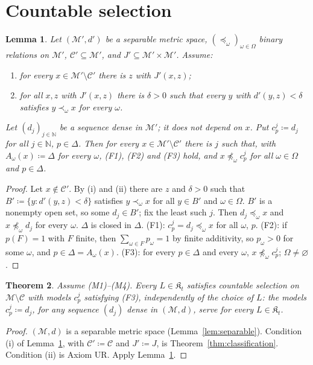 \documentclass[11pt]{article}
\newtheorem{theorem}{Theorem}[section]
\newtheorem{lemma}[theorem]{Lemma}
\theoremstyle{definition}
\newcommand{\M}{\mathcal M}
\newcommand{\C}{\mathcal C}
\newcommand{\K}{\mathfrak K}
\newcommand{\N}{\mathbb N}
\begin{document}
\section{Countable selection}\label{sec:selection}

\begin{lemma}\label{lem:general-selection}
Let $(\M',d')$ be a separable metric space, $(\preceq_\omega)_{\omega\in\Omega}$ binary relations on $\M'$, $\C'\subseteq\M'$, and $J'\subseteq\M'\times\M'$. Assume:
\begin{enumerate}[label=(\roman*)]
\item for every $x\in\M'\setminus\C'$ there is $z$ with $J'(x,z)$;
\item for all $x,z$ with $J'(x,z)$ there is $\delta>0$ such that every $y$ with $d'(y,z)<\delta$ satisfies $y\prec_\omega x$ for every $\omega$.
\end{enumerate}
Let $(d_j)_{j\in\N}$ be a sequence dense in $\M'$; it does not depend on $x$. Put $c^j_p\coloneqq d_j$ for all $j\in\N$, $p\in\Delta$. Then for every $x\in\M'\setminus\C'$ there is $j$ such that, with $A_\omega(x)\coloneqq\Delta$ for every $\omega$, (F1), (F2) and (F3) hold, and $x\not\preceq_\omega c^j_p$ for all $\omega\in\Omega$ and $p\in\Delta$.
\end{lemma}
\begin{proof}
Let $x\notin\C'$. By (i) and (ii) there are $z$ and $\delta>0$ such that $B'\coloneqq\{y:d'(y,z)<\delta\}$ satisfies $y\prec_\omega x$ for all $y\in B'$ and $\omega\in\Omega$. $B'$ is a nonempty open set, so some $d_j\in B'$; fix the least such $j$. Then $d_j\preceq_\omega x$ and $x\not\preceq_\omega d_j$ for every $\omega$. $\Delta$ is closed in $\Delta$. (F1): $c^j_p=d_j\preceq_\omega x$ for all $\omega$, $p$. (F2): if $p(F)=1$ with $F$ finite, then $\sum_{\omega\in F}p_\omega=1$ by finite additivity, so $p_\omega>0$ for some $\omega$, and $p\in\Delta=A_\omega(x)$. (F3): for every $p\in\Delta$ and every $\omega$, $x\not\preceq_\omega c^j_p$; $\Omega\ne\varnothing$.
\end{proof}

\begin{theorem}\label{thm:selection}
Assume (M1)--(M4). Every $L\in\K_t$ satisfies countable selection on $\M\setminus\C$ with models $c^j_p$ satisfying (F3), independently of the choice of $L$: the models $c^j_p\coloneqq d_j$, for any sequence $(d_j)$ dense in $(\M,d)$, serve for every $L\in\K_t$.
\end{theorem}
\begin{proof}
$(\M,d)$ is a separable metric space (Lemma~\ref{lem:separable}). Condition (i) of Lemma~\ref{lem:general-selection}, with $\C'\coloneqq\C$ and $J'\coloneqq J$, is Theorem~\ref{thm:classification}. Condition (ii) is Axiom UR. Apply Lemma~\ref{lem:general-selection}.
\end{proof}
\end{document}
